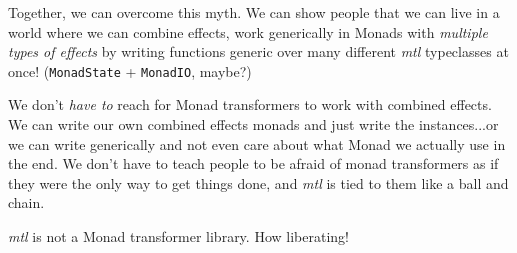 \documentclass[]{article}
\begin{document}
Together, we can overcome this myth. We can show people that we can live in a
world where we can combine effects, work generically in Monads with
\emph{multiple types of effects} by writing functions generic over many
different \emph{mtl} typeclasses at once! (\texttt{MonadState} +
\texttt{MonadIO}, maybe?)

We don't \emph{have to} reach for Monad transformers to work with combined
effects. We can write our own combined effects monads and just write the
instances...or we can write generically and not even care about what Monad we
actually use in the end. We don't have to teach people to be afraid of monad
transformers as if they were the only way to get things done, and \emph{mtl} is
tied to them like a ball and chain.

\emph{mtl} is not a Monad transformer library. How liberating!
\end{document}
